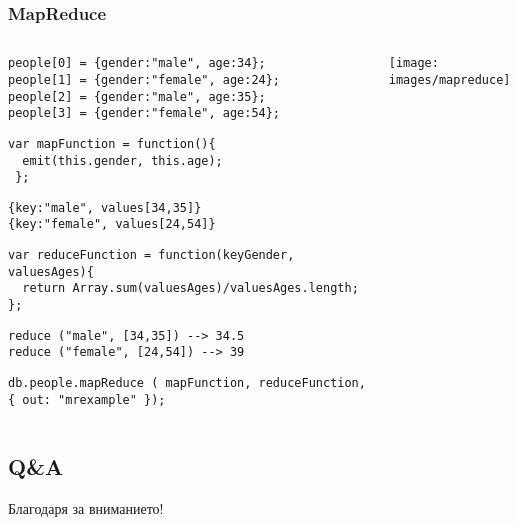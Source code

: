 \documentclass{beamer}
\begin{document}
\begin{frame}[fragile]
\frametitle{MapReduce}

\begin{columns}
  \begin{column}{0.6\textwidth}


\begin{lstlisting}
people[0] = {gender:"male", age:34};
people[1] = {gender:"female", age:24};
people[2] = {gender:"male", age:35};
people[3] = {gender:"female", age:54};
\end{lstlisting}


\vspace{0.2cm}
\pause


\begin{lstlisting}
var mapFunction = function(){
  emit(this.gender, this.age);
 };
\end{lstlisting}

\vspace{0.2cm}
\pause



\begin{lstlisting}
{key:"male", values[34,35]}
{key:"female", values[24,54]}
\end{lstlisting}




\vspace{0.2cm}
\pause

\begin{lstlisting}
var reduceFunction = function(keyGender, valuesAges){
  return Array.sum(valuesAges)/valuesAges.length;
};
\end{lstlisting}

\vspace{0.2cm}
\pause


\begin{lstlisting}
reduce ("male", [34,35]) --> 34.5
reduce ("female", [24,54]) --> 39
\end{lstlisting}

\pause
\begin{lstlisting}
db.people.mapReduce ( mapFunction, reduceFunction, { out: "mrexample" });
\end{lstlisting}



  \end{column}
  \begin{column}{0.4\textwidth}
    \texttt{[image: images/mapreduce]}
  \end{column}
\end{columns}



\end{frame}


\subsection{Q\&A}

\begin{frame}
\centerline{Благодаря за вниманието!}
\end{frame}
\end{document}

